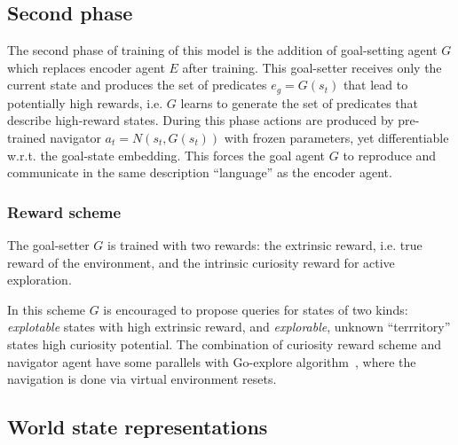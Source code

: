 \documentclass[acmsmall, nonacm]{acmart}
\begin{document}

\subsection{Second phase}

The second phase of training of this model is the addition of goal-setting agent $G$ which replaces encoder agent $E$ after training.
%
This goal-setter receives only the current state and produces the set of predicates $e_g = G(s_t)$ that lead to potentially high rewards, i.e. $G$ learns to generate the set of predicates that describe high-reward states. During this phase actions are produced by pre-trained navigator $a_t = N(s_t, G(s_t))$ with frozen parameters, yet differentiable w.r.t. the goal-state embedding. This forces the goal agent $G$ to reproduce and communicate in the same description ``language'' as the encoder agent.


\subsubsection{Reward scheme}

The goal-setter $G$ is trained with two rewards: the extrinsic reward, i.e. true reward of the environment, and the intrinsic curiosity reward\textbf{} for active exploration.

In this scheme $G$ is encouraged to propose queries for states of two kinds: \emph{explotable} states with high extrinsic reward, and \emph{explorable}, unknown ``terrritory'' states high curiosity potential.
%
The combination of curiosity reward scheme and navigator agent have some parallels with Go-explore algorithm~\citep{ecoffet_first_2021}, where the navigation is done via virtual environment resets.


\subsection{World state representations}
\end{document}
